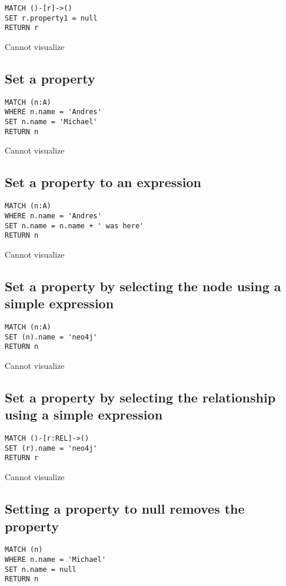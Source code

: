 \begin{lstlisting}
MATCH ()-[r]->()
SET r.property1 = null
RETURN r
\end{lstlisting}

Cannot visualize
\subsection{Set a property}

\begin{lstlisting}
MATCH (n:A)
WHERE n.name = 'Andres'
SET n.name = 'Michael'
RETURN n
\end{lstlisting}

Cannot visualize
\subsection{Set a property to an expression}

\begin{lstlisting}
MATCH (n:A)
WHERE n.name = 'Andres'
SET n.name = n.name + ' was here'
RETURN n
\end{lstlisting}

Cannot visualize
\subsection{Set a property by selecting the node using a simple expression}

\begin{lstlisting}
MATCH (n:A)
SET (n).name = 'neo4j'
RETURN n
\end{lstlisting}

Cannot visualize
\subsection{Set a property by selecting the relationship using a simple expression}

\begin{lstlisting}
MATCH ()-[r:REL]->()
SET (r).name = 'neo4j'
RETURN r
\end{lstlisting}

Cannot visualize
\subsection{Setting a property to null removes the property}

\begin{lstlisting}
MATCH (n)
WHERE n.name = 'Michael'
SET n.name = null
RETURN n
\end{lstlisting}

